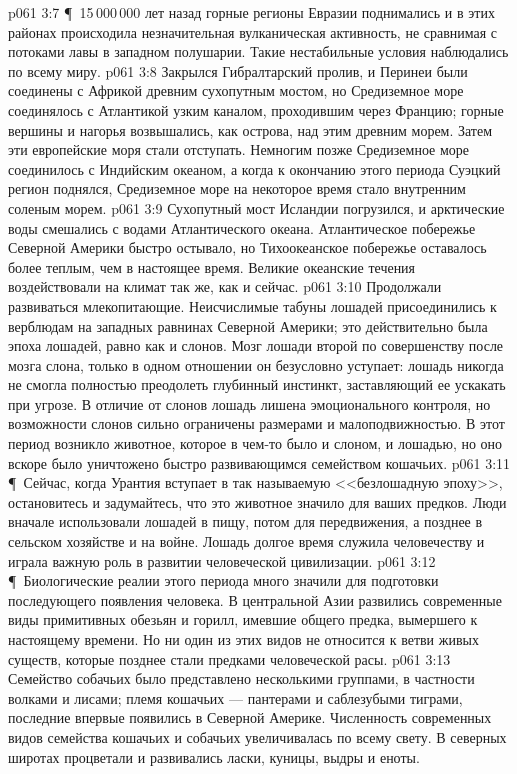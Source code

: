\vs p061 3:7 \P\ 15\,000\,000 лет назад горные регионы Евразии поднимались и в этих районах происходила незначительная вулканическая активность, не сравнимая с потоками лавы в западном полушарии. Такие нестабильные условия наблюдались по всему миру.
\vs p061 3:8 Закрылся Гибралтарский пролив, и Перинеи были соединены с Африкой древним сухопутным мостом, но Средиземное море соединялось с Атлантикой узким каналом, проходившим через Францию; горные вершины и нагорья возвышались, как острова, над этим древним морем. Затем эти европейские моря стали отступать. Немногим позже Средиземное море соединилось с Индийским океаном, а когда к окончанию этого периода Суэцкий регион поднялся, Средиземное море на некоторое время стало внутренним соленым морем.
\vs p061 3:9 Сухопутный мост Исландии погрузился, и арктические воды смешались с водами Атлантического океана. Атлантическое побережье Северной Америки быстро остывало, но Тихоокеанское побережье оставалось более теплым, чем в настоящее время. Великие океанские течения воздействовали на климат так же, как и сейчас.
\vs p061 3:10 Продолжали развиваться млекопитающие. Неисчислимые табуны лошадей присоединились к верблюдам на западных равнинах Северной Америки; это действительно была эпоха лошадей, равно как и слонов. Мозг лошади второй по совершенству после мозга слона, только в одном отношении он безусловно уступает: лошадь никогда не смогла полностью преодолеть глубинный инстинкт, заставляющий ее ускакать при угрозе. В отличие от слонов лошадь лишена эмоционального контроля, но возможности слонов сильно ограничены размерами и малоподвижностью. В этот период возникло животное, которое в чем\hyp{}то было и слоном, и лошадью, но оно вскоре было уничтожено быстро развивающимся семейством кошачьих.
\vs p061 3:11 \P\ Сейчас, когда Урантия вступает в так называемую <<безлошадную эпоху>>, остановитесь и задумайтесь, что это животное значило для ваших предков. Люди вначале использовали лошадей в пищу, потом для передвижения, а позднее в сельском хозяйстве и на войне. Лошадь долгое время служила человечеству и играла важную роль в развитии человеческой цивилизации.
\vs p061 3:12 \P\ Биологические реалии этого периода много значили для подготовки последующего появления человека. В центральной Азии развились современные виды примитивных обезьян и горилл, имевшие общего предка, вымершего к настоящему времени. Но ни один из этих видов не относится к ветви живых существ, которые позднее стали предками человеческой расы.
\vs p061 3:13 Семейство собачьих было представлено несколькими группами, в частности волками и лисами; племя кошачьих --- пантерами и саблезубыми тиграми, последние впервые появились в Северной Америке. Численность современных видов семейства кошачьих и собачьих увеличивалась по всему свету. В северных широтах процветали и развивались ласки, куницы, выдры и еноты.
